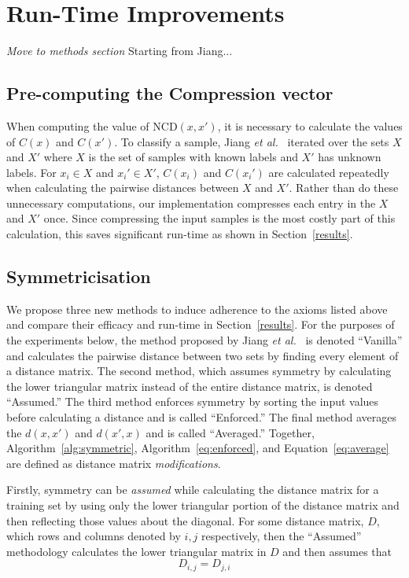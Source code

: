 \documentclass[preprint,12pt]{article}
\newcommand{\cm}[1]{\textit{{\color{blue}#1}}}
\begin{document}
\section{Run-Time Improvements}
\cm{Move to methods section}
\label{improvements}
Starting from Jiang...



\subsection{Pre-computing the Compression vector}
\label{pre_compute_compression}

When computing the value of NCD$(x,x')$, it is necessary to calculate the values of $C(x)$ and $C(x')$. 
To classify a sample, Jiang \textit{et al.}~\cite{jiang2022less} iterated over the sets $X$ and $X'$ where $X$ is the set of samples with known labels and $X'$ has unknown labels. 
For $x_i \in X$ and $x_i' \in X'$, $C(x_i)$ and $C(x_i')$ are calculated repeatedly when calculating the pairwise distances between $X$ and $X'$.
Rather than do these unnecessary computations, our implementation compresses each entry in the $X$ and $X'$ once. 
Since compressing the input samples is the most costly part of this calculation, this saves significant run-time as shown in Section~\ref{results}.

\subsection{Symmetricisation}
\label{modifications}

We propose three new methods to induce adherence to the axioms listed above and compare their efficacy and run-time in Section~\ref{results}.
For the purposes of the experiments below, the method proposed by Jiang \textit{et al.}~\cite{jiang2022less} is denoted ``Vanilla'' and calculates the pairwise distance between two sets by finding every element of a distance matrix. 
The second method, which assumes symmetry by calculating the lower triangular matrix instead of the entire distance matrix, is denoted ``Assumed.''
The third method enforces symmetry by sorting the input values before calculating a distance and is called ``Enforced.''
The final method averages the $d(x,x')$ and $d(x',x)$ and is called ``Averaged.''
Together, Algorithm~\ref{alg:symmetric}, Algorithm~\ref{eq:enforced}, and Equation~\ref{eq:average} are defined as distance matrix \textit{modifications}. 



Firstly, symmetry can be \textit{assumed} while calculating the distance matrix for a training set by using only the lower triangular portion of the distance matrix and then reflecting those values about the diagonal.
For some distance matrix, $D$, which rows and columns denoted by $i,j$ respectively, then the ``Assumed'' methodology calculates the lower triangular matrix in $D$ and then assumes that 
\begin{equation}
    D_{i,j} = D_{j,i}
    \label{eq:assumed}
\end{equation}
\end{document}
